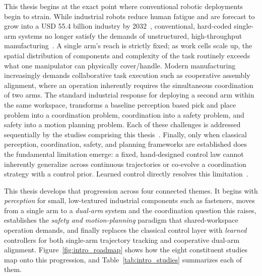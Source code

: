 This thesis begins at the exact point where conventional robotic deployments begin to strain. While industrial robots reduce human fatigue and are forecast to grow into a USD 55.4 billion industry by 2032~\citep{develop2024robotic}, conventional, hard-coded single-arm systems no longer satisfy the demands of unstructured, high-throughput manufacturing~\citep{abbas2023systematic}. A single arm's reach is strictly fixed; as work cells scale up, the spatial distribution of components and complexity of the task routinely exceeds what one manipulator can physically cover/handle. Modern manufacturing increasingly demands collaborative task execution such as cooperative assembly alignment, where an operation inherently requires the simultaneous coordination of two arms. The standard industrial response for deploying a second arm within the same workspace, transforms a baseline perception based pick and place problem into a coordination problem, coordination into a safety problem, and safety into a motion planning problem. Each of these challenges is addressed sequentially by the studies comprising this thesis~\citep{surya2025iapf,sk2025competitive}. Finally, only when classical perception, coordination, safety, and planning frameworks are established does the fundamental limitation emerge: a fixed, hand-designed control law cannot inherently generalize across continuous trajectories or co-evolve a coordination strategy with a control prior. Learned control directly resolves this limitation~\citep{sk2025diktracking,sk2026priorguided}.

This thesis develops that progression across four connected themes. It begins with
\emph{perception} for small, low-textured industrial components such as fasteners, moves from a single arm to a \emph{dual-arm} system and the coordination question this raises, establishes the \emph{safety and motion-planning} paradigm that shared-workspace operation demands, and finally replaces the classical control layer with \emph{learned} controllers for both single-arm trajectory tracking and cooperative dual-arm alignment. Figure~\ref{fig:intro_roadmap} shows how the eight constituent studies map onto this progression, and Table~\ref{tab:intro_studies} summarizes each of them.


